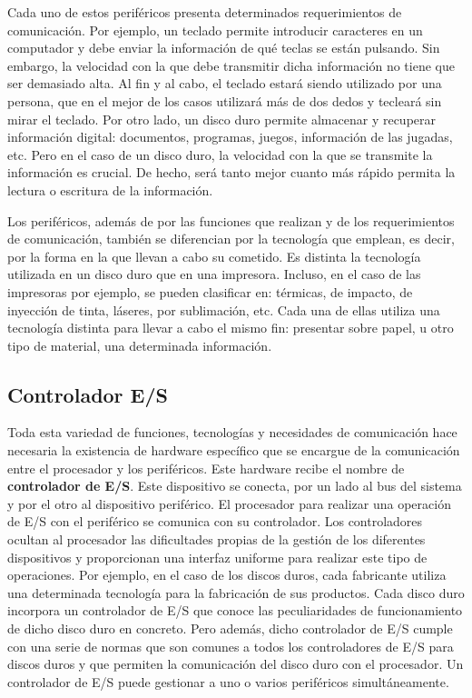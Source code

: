 Cada uno de estos periféricos presenta determinados requerimientos de comunicación. Por ejemplo, un teclado permite introducir caracteres en un computador y debe enviar la información de qué teclas se están pulsando. Sin embargo, la velocidad con la que debe transmitir dicha información no tiene que ser demasiado alta. Al fin y al cabo, el teclado estará siendo utilizado por una persona, que en el mejor  de los casos utilizará más de dos dedos y tecleará sin mirar el teclado. Por otro lado, un disco duro permite almacenar y recuperar información digital: documentos, programas, juegos, información de las jugadas, etc. Pero en el caso de un disco duro, la velocidad con la que se transmite la información es crucial. De hecho, será tanto mejor cuanto más rápido permita la lectura o escritura de la información.

Los periféricos, además de por las funciones que realizan y de los requerimientos de comunicación, también se diferencian por la tecnología que emplean, es decir, por la forma en la que llevan a cabo su cometido. Es distinta la tecnología utilizada en un disco duro que en una impresora. Incluso, en el caso de las impresoras por ejemplo,  se pueden clasificar en: térmicas, de impacto, de inyección de tinta, láseres, por sublimación, etc. Cada una de ellas utiliza una tecnología distinta para llevar a cabo el mismo fin: presentar sobre papel, u otro tipo de material, una determinada información.

\subsection{Controlador E/S}
Toda esta variedad de funciones,  tecnologías y  necesidades de comunicación hace necesaria la existencia de hardware específico que se encargue de  la comunicación entre el procesador y los periféricos. Este  hardware recibe el nombre de \textbf{controlador de E/S}. Este dispositivo se conecta, por un lado al bus del sistema y por el otro al dispositivo periférico. El procesador para realizar una operación de E/S con el periférico se comunica con su controlador. Los controladores ocultan al procesador las dificultades propias de la gestión de los diferentes dispositivos y proporcionan una interfaz uniforme para realizar  este tipo de  operaciones.  Por ejemplo, en el caso de los discos duros, cada fabricante utiliza una determinada tecnología para la fabricación de sus productos. Cada disco duro incorpora un controlador de E/S que conoce las peculiaridades de funcionamiento de dicho disco duro en concreto. Pero además, dicho controlador de E/S cumple con una serie de normas que son comunes a todos los controladores de
E/S para discos duros y que permiten la comunicación del disco duro con el procesador. Un controlador de E/S puede gestionar a uno o varios periféricos simultáneamente.

